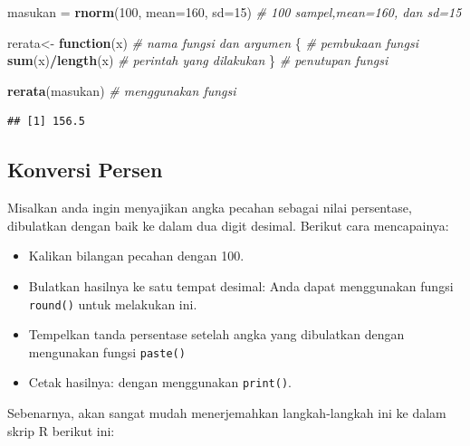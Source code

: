 \documentclass[
]{book}
\newenvironment{Shaded}{\begin{snugshade}}{\end{snugshade}}
\newcommand{\AttributeTok}[1]{\textcolor[rgb]{0.13,0.29,0.53}{#1}}
\newcommand{\CommentTok}[1]{\textcolor[rgb]{0.56,0.35,0.01}{\textit{#1}}}
\newcommand{\ControlFlowTok}[1]{\textcolor[rgb]{0.13,0.29,0.53}{\textbf{#1}}}
\newcommand{\DecValTok}[1]{\textcolor[rgb]{0.00,0.00,0.81}{#1}}
\newcommand{\FunctionTok}[1]{\textcolor[rgb]{0.13,0.29,0.53}{\textbf{#1}}}
\newcommand{\NormalTok}[1]{#1}
\newcommand{\OtherTok}[1]{\textcolor[rgb]{0.56,0.35,0.01}{#1}}
\newcommand{\SpecialCharTok}[1]{\textcolor[rgb]{0.81,0.36,0.00}{\textbf{#1}}}
\providecommand{\tightlist}{%
  \setlength{\itemsep}{0pt}\setlength{\parskip}{0pt}}
\begin{document}
\begin{Shaded}
\begin{Highlighting}[]
\NormalTok{masukan }\OtherTok{=} \FunctionTok{rnorm}\NormalTok{(}\DecValTok{100}\NormalTok{, }\AttributeTok{mean=}\DecValTok{160}\NormalTok{, }\AttributeTok{sd=}\DecValTok{15}\NormalTok{)        }\CommentTok{\# 100 sampel,mean=160, dan sd=15 }

\NormalTok{rerata}\OtherTok{\textless{}{-}} \ControlFlowTok{function}\NormalTok{(x)                         }\CommentTok{\# nama fungsi dan argumen   }
\NormalTok{\{                                            }\CommentTok{\# pembukaan fungsi}
  \FunctionTok{sum}\NormalTok{(x)}\SpecialCharTok{/}\FunctionTok{length}\NormalTok{(x)                           }\CommentTok{\# perintah yang dilakukan }
\NormalTok{\}                                            }\CommentTok{\# penutupan fungsi}

\FunctionTok{rerata}\NormalTok{(masukan)                              }\CommentTok{\# menggunakan fungsi}
\end{Highlighting}
\end{Shaded}

\begin{verbatim}
## [1] 156.5
\end{verbatim}

\hypertarget{konversi-persen}{%
\subsection{Konversi Persen}\label{konversi-persen}}

Misalkan anda ingin menyajikan angka pecahan sebagai nilai persentase, dibulatkan dengan baik ke dalam dua digit desimal. Berikut cara mencapainya:

\begin{itemize}
\tightlist
\item
  Kalikan bilangan pecahan dengan 100.
\item
  Bulatkan hasilnya ke satu tempat desimal: Anda dapat menggunakan fungsi \texttt{round()} untuk melakukan ini.
\item
  Tempelkan tanda persentase setelah angka yang dibulatkan dengan mengunakan fungsi \texttt{paste()}
\item
  Cetak hasilnya: dengan menggunakan \texttt{print()}.
\end{itemize}

Sebenarnya, akan sangat mudah menerjemahkan langkah-langkah ini ke dalam skrip R berikut ini:
\end{document}
